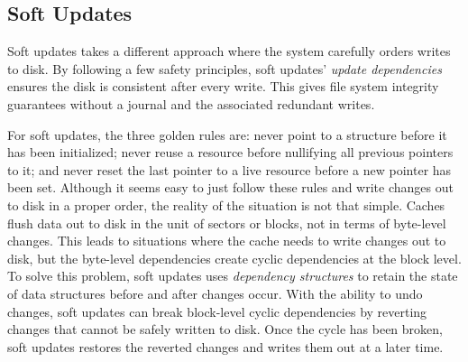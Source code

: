 \subsection{Soft Updates}
\label{sec:softupdates}

Soft updates takes a different approach where the system carefully orders
writes to disk. By following a few safety principles, soft
updates' \emph{update dependencies} ensures the disk is consistent after every
write. This gives file system integrity guarantees without a journal and the
associated redundant writes. 

For soft updates, the three golden rules are: never point to a structure
before it has been initialized; never reuse a resource before nullifying
all previous pointers to it; and never reset the last pointer to a live
resource before a new pointer has been set. Although it seems easy to just
follow these rules and write changes out to disk in a proper order, the
reality of the situation is not that simple. Caches flush data out to disk
in the unit of sectors or blocks, not in terms of byte-level changes. This
leads to situations where the cache needs to write changes out to disk, but
the byte-level dependencies create cyclic dependencies at the block level.
To solve this problem, soft updates uses \emph{dependency structures} to
retain the state of data structures before and after changes occur. With the
ability to undo changes, soft updates can break block-level cyclic dependencies
by reverting changes that cannot be safely written to disk. Once the cycle has
been broken, soft updates restores the reverted changes and writes them out at
a later time.
%

